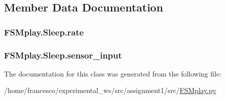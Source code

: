\subsection{Member Data Documentation}
\subsubsection[{\texorpdfstring{rate}{rate}}]{\setlength{\rightskip}{0pt plus 5cm}F\+S\+Mplay.\+Sleep.\+rate}\hypertarget{classFSMplay_1_1Sleep_a85f03dc0ae8811e617eaef79ac9d3835}{}\label{classFSMplay_1_1Sleep_a85f03dc0ae8811e617eaef79ac9d3835}
\subsubsection[{\texorpdfstring{sensor\+\_\+input}{sensor_input}}]{\setlength{\rightskip}{0pt plus 5cm}F\+S\+Mplay.\+Sleep.\+sensor\+\_\+input}\hypertarget{classFSMplay_1_1Sleep_a911ff4d10f330e63ac1d0c34ec2003c3}{}\label{classFSMplay_1_1Sleep_a911ff4d10f330e63ac1d0c34ec2003c3}


The documentation for this class was generated from the following file\+:\begin{DoxyCompactItemize}
\item 
/home/francesco/experimental\+\_\+ws/src/assignment1/src/\hyperlink{FSMplay_8py}{F\+S\+Mplay.\+py}\end{DoxyCompactItemize}
